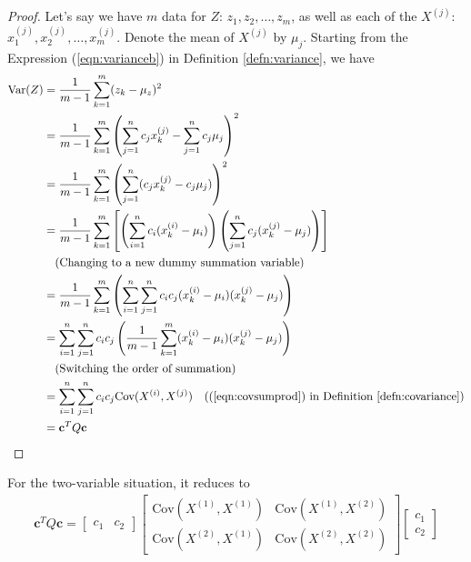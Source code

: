 \begin{proof}
Let's say we have $m$ data for $Z$: $z_1, z_2, \ldots, z_m$, as well as each of the $X^{(j)}$: $x_1^{(j)}, x_2^{(j)}, \ldots, x_m^{(j)}$. Denote the mean of $X^{(j)}$ by $\mu_{j}$. Starting from the Expression (\ref{eqn:varianceb}) in Definition \ref{defn:variance}, we have
\begin{align*}
\text{Var}(Z) &= \frac{1}{m-1} \sum_{k=1}^m (z_k - \mu_z)^2 \\
&= \frac{1}{m-1} \sum_{k=1}^m \left(\sum_{j=1}^{n} c_jx^{(j)}_k - \sum_{j=1}^{n} c_j\mu_{j}\right)^2  \\
&= \frac{1}{m-1} \sum_{k=1}^m \left(\sum_{j=1}^{n} (c_jx^{(j)}_k - c_j\mu_{j})\right)^2 \\
&= \frac{1}{m-1} \sum_{k=1}^m \left[\left(\sum_{i=1}^{n} c_i(x^{(i)}_k - \mu_{i})\right)\left(\sum_{j=1}^{n} c_j(x^{(j)}_k - \mu_{j})\right)\right]  \\
&\quad \text{(Changing to a new dummy summation variable)} \\
&= \frac{1}{m-1} \sum_{k=1}^m \left(\sum_{i=1}^{n}\sum_{j=1}^{n} c_ic_j (x^{(i)}_k - \mu_{i})(x^{(j)}_k - \mu_{j})\right) \\
&= \sum_{i=1}^{n}\sum_{j=1}^{n} c_ic_j \left(\frac{1}{m-1} \sum_{k=1}^m (x^{(i)}_k - \mu_{i})(x^{(j)}_k - \mu_{j})\right) \\
&\quad \text{(Switching the order of summation)} \\
&= \sum_{i=1}^{n}\sum_{j=1}^{n} c_ic_j\text{Cov}(X^{(i)}, X^{(j)}) \quad \text{((\ref{eqn:covsumprod}) in Definition \ref{defn:covariance})} \\
&= \textbf{c}^T Q\textbf{c}
\end{align*}
\end{proof}
For the two-variable situation, it reduces to
\begin{align}
\textbf{c}^TQ\textbf{c} =
\begin{bmatrix}
c_1 & c_2
\end{bmatrix}
\begin{bmatrix}
\text{Cov}(X^{(1)}, X^{(1)}) & \text{Cov}(X^{(1)}, X^{(2)}) \\
\text{Cov}
(X^{(2)}, X^{(1)}) & \text{Cov}(X^{(2)}, X^{(2)}) 
\end{bmatrix}
\begin{bmatrix}
c_1 \\
c_2
\end{bmatrix}
\label{eqn:cov2var}
\end{align}

